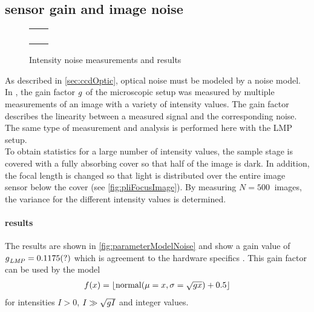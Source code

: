 \subsection{sensor gain and image noise}\label{sec:sensorGain}
%
\begin{figure}[!t]
\centering
% 
\setlength{\tikzwidth}{0.3\textwidth}
\setlength{\tikzheight}{0.3\textwidth}
% 
\setlength{\tabcolsep}{0em}
\begin{tabular}{C{0.5\textwidth}C{0.5\textwidth}}
&
\\[-1em]
% 
 &
 \\[2em]
% 
&
\\[-1em]
% 
 &
\end{tabular}
% 
\caption[Noise analysis]{Intensity noise measurements and results}
\label{fig:parameterModelGain}
\end{figure}
% 
As described in \cref{sec:ccdOptic}, optical noise must be modeled by a noise model.
In \cite{Wiese:887678}, the gain factor $\textnormal{$g$}$ of the microscopic setup was measured by multiple measurements of an image with a variety of intensity values. 
The gain factor describes the linearity between a measured signal and the corresponding noise.
The same type of measurement and analysis is performed here with the \ac{LMP} setup.
\\
To obtain statistics for a large number of intensity values, the sample stage is covered with a fully absorbing cover so that half of the image is dark.
In addition, the focal length is changed so that light is distributed over the entire image sensor below the cover (see \cref{fig:pliFocusImage}).
By measuring $N=\SI{500}{}$ images, the variance for the different intensity values is determined.
% 
\paragraph{results}
The results are shown in \cref{fig:parameterModelNoise} and show a gain value of $\textnormal{$g$}_{\mathit{LMP}} = \SI{0.1175}{}(?)$ which is agreement to the hardware specifics .
This gain factor can be used by the model
\begin{align}
f(x) = \lfloor\mathrm{normal}(\mu = x, \sigma=\sqrt{\textnormal{$g$} x})+0.5\rfloor
\end{align}
for intensities $I > 0$, $I \gg \sqrt{\textnormal{$g$} I}$ and integer values.
% 
% 
% 
